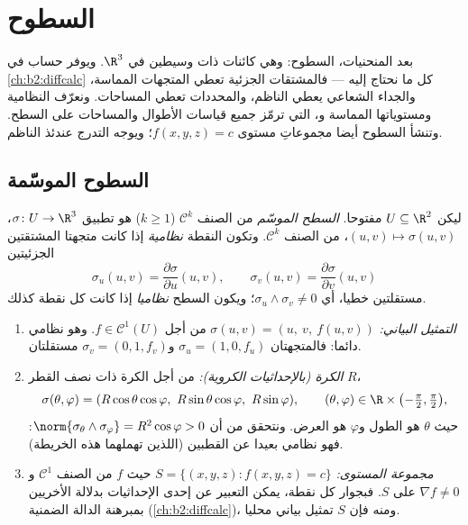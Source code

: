 \chapter{السطوح}\label{ch:b2:surfaces}

بعد المنحنيات، السطوح: وهي كائنات ذات وسيطين في $\R^3$. ويوفر حساب
 في \cref{ch:b2:diffcalc} كل ما نحتاج إليه --- فالمشتقات الجزئية تعطي المتجهات
المماسة، والجداء الشعاعي يعطي الناظم، والمحددات تعطي المساحات. ونعرّف
 النظامية ومستوياتها المماسة و\emph{}، التي ترمّز جميع قياسات الأطوال والمساحات على السطح. وتنشأ
السطوح أيضا مجموعاتِ مستوى $f(x, y, z) = c$؛ ويوجه التدرج عندئذ الناظم.

\section{السطوح الموسّمة}

\begin{definition}\label{def:b2:surfaces:param}
ليكن $U \subseteq \R^2$ مفتوحا. \emph{السطح الموسّم} من الصنف
$\mathcal{C}^k$ ($k \geq 1$) هو تطبيق $\sigma \colon U \to
\R^3$، $(u, v) \mapsto \sigma(u, v)$، من الصنف $\mathcal{C}^k$. وتكون النقطة
\emph{نظامية} إذا كانت متجهتا المشتقتين الجزئيتين
\[
\sigma_u(u, v) = \frac{\partial\sigma}{\partial u}(u,v),
\qquad
\sigma_v(u, v) = \frac{\partial\sigma}{\partial v}(u,v)
\]
مستقلتين خطيا، أي $\sigma_u \wedge \sigma_v \neq 0$؛ ويكون السطح \emph{نظاميا} إذا كانت كل نقطة
كذلك.
\end{definition}

\begin{example}\label{ex:b2:surfaces:standard}
\leavevmode
\begin{enumerate}
\item \emph{التمثيل البياني:} $\sigma(u, v) = (u,\ v,\ f(u, v))$ من أجل $f \in
\mathcal{C}^1(U)$. وهو نظامي دائما:
فالمتجهتان $\sigma_u = (1, 0, f_u)$ و$\sigma_v = (0, 1, f_v)$ مستقلتان.
\item \emph{الكرة (بالإحداثيات الكروية):} من أجل الكرة ذات نصف
القطر $R$،
\[
\sigma(\theta, \varphi)
= (R\cos\theta\cos\varphi,\ R\sin\theta\cos\varphi,\
R\sin\varphi),
\qquad
(\theta, \varphi) \in \R \times
\bigl(-\tfrac\pi2, \tfrac\pi2\bigr),
\]
حيث $\theta$ هو الطول و$\varphi$ هو العرض. ونتحقق من أن $\norm{\sigma_\theta \wedge \sigma_\varphi} = R^2\cos\varphi > 0$: فهو نظامي
بعيدا عن القطبين (اللذين تهملهما هذه الخريطة).
\item \emph{مجموعة المستوى:} $S = \{(x,y,z) : f(x, y, z) = c\}$ حيث $f$ من الصنف $\mathcal{C}^1$
و$\nabla f \neq 0$ على $S$. فبجوار كل نقطة، يمكن التعبير عن إحدى الإحداثيات
بدلالة الأخريين بمبرهنة الدالة الضمنية (\cref{ch:b2:diffcalc})، ومنه فإن $S$
تمثيل بياني محليا.
\end{enumerate}
\end{example}

